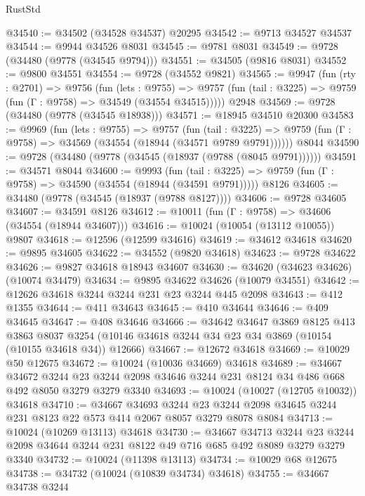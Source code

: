 \begin{lexlean}{RustStd}
\begin{coremodule}
@34540 := @34502 (@34528 @34537) @20295
@34542 := @9713 @34527 @34537
@34544 := @9944 @34526 @8031
@34545 := @9781 @8031
@34549 := @9728 (@34480 (@9778 (@34545 @9794)))
@34551 := @34505 (@9816 @8031)
@34552 := @9800 @34551
@34554 := @9728 (@34552 @9821)
@34565 := @9947
    (fun (rty : @2701) =>
    @9756
      (fun (lets : @9755) =>
      @9757 (fun (tail : @3225) => @9759 (fun (Γ : @9758) => @34549 (@34554 @34515)))))
    @2948
@34569 := @9728 (@34480 (@9778 (@34545 @18938)))
@34571 := @18945 @34510 @20300
@34583 := @9969
    (fun (lets : @9755) =>
    @9757
      (fun (tail : @3225) =>
      @9759 (fun (Γ : @9758) => @34569 (@34554 (@18944 (@34571 @9789 @9791))))))
    @8044
@34590 := @9728 (@34480 (@9778 (@34545 (@18937 (@9788 (@8045 @9791))))))
@34591 := @34571 @8044
@34600 := @9993
    (fun (tail : @3225) => @9759 (fun (Γ : @9758) => @34590 (@34554 (@18944 (@34591 @9791)))))
    @8126
@34605 := @34480 (@9778 (@34545 (@18937 (@9788 @8127))))
@34606 := @9728 @34605
@34607 := @34591 @8126
@34612 := @10011 (fun (Γ : @9758) => @34606 (@34554 (@18944 @34607)))
@34616 := @10024 (@10054 (@13112 @10055)) @9807
@34618 := @12596 (@12599 @34616)
@34619 := @34612 @34618
@34620 := @9895 @34605
@34622 := @34552 (@9820 @34618)
@34623 := @9728 @34622
@34626 := @9827 @34618 @18943 @34607
@34630 := @34620 (@34623 @34626) (@10074 @34479)
@34634 := @9895 @34622 @34626 (@10079 @34551)
@34642 := @12626 @34618 @3244 @3244 @231 @23 @3244 @445 @2098
@34643 := @412 @1355
@34644 := @411 @34643
@34645 := @410 @34644
@34646 := @409 @34645
@34647 := @408 @34646
@34666 := @34642
    @34647
    @3869
    @8125
    @413
    @3863
    @8037
    @3254
    (@10146 @34618 @3244 @34 @23 @34 @3869 (@10154 (@10155 @34618 @34)) @12666)
@34667 := @12672 @34618
@34669 := @10029 @50 @12675
@34672 := @10024 (@10036 @34669) @34618
@34689 := @34667
    @34672
    @3244
    @23
    @3244
    @2098
    @34646
    @3244
    @231
    @8124
    @34
    @486
    @668
    @492
    @8050
    @3279
    @3279
    @3340
@34693 := @10024 (@10027 (@12705 @10032)) @34618
@34710 := @34667
    @34693
    @3244
    @23
    @3244
    @2098
    @34645
    @3244
    @231
    @8123
    @22
    @573
    @414
    @2067
    @8057
    @3279
    @8078
    @8084
@34713 := @10024 (@10269 @13113) @34618
@34730 := @34667
    @34713
    @3244
    @23
    @3244
    @2098
    @34644
    @3244
    @231
    @8122
    @49
    @716
    @685
    @492
    @8089
    @3279
    @3279
    @3340
@34732 := @10024 (@11398 @13113)
@34734 := @10029 @68 @12675
@34738 := @34732 (@10024 (@10839 @34734) @34618)
@34755 := @34667
    @34738
    @3244

\end{coremodule}
\end{lexlean}
